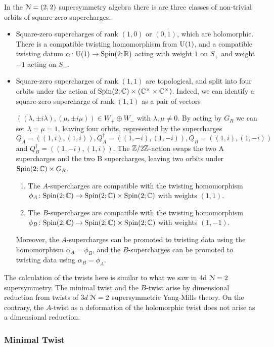 \documentclass[10pt, oneside]{article}
\begin{document}
In the $\mathcal{N}=(2,2)$ supersymmetry algebra there is are three classes of non-trivial orbits of square-zero supercharges.  
\begin{itemize}
 \item Square-zero supercharges of rank $(1,0)$ or $(0,1)$, which are holomorphic.  
There is a compatible twisting homomorphism from $\mathrm{U}(1)$, and a compatible twisting datum $\alpha \colon \mathrm{U}(1) \to \mathrm{Spin}(2;\mathbb R)$ acting with weight $1$ on $S_+$ and weight $-1$ acting on $S_-$.  
 \item Square-zero supercharges of rank $(1,1)$ are topological, and split into four orbits under the action of $\mathrm{Spin}(2;\mathbb C) \times (\mathbb C^\times \times \mathbb C^\times)$.  Indeed, we can identify a square-zero supercharge of rank $(1,1)$ as a pair of vectors~
 
\noindent$((\lambda, \pm i \lambda), (\mu, \pm i \mu)) \in W_+ \oplus W_-$ with $\lambda, \mu \ne 0$.  By acting by $G_R$ we can set $\lambda = \mu = 1$, leaving four orbits, represented by the supercharges $Q_A = ((1,i),(1,i)), Q_A^\dagger = ((1,-i),(1,-i)), Q_B = ((1,i),(1,-i))$ and $Q_B^\dagger = ((1,-i),(1,i))$.  The $\mathbb Z/2\mathbb Z$-action swaps the two A supercharges and the two B supercharges, leaving two orbits under $\mathrm{Spin}(2;\mathbb C) \times G_R$.  
\begin{enumerate}
\item The $A$-supercharges are compatible with the twisting homomorphism $\phi_{A} \colon \mathrm{Spin}(2;\mathbb C) \to \mathrm{Spin}(2;\mathbb C) \times \mathrm{Spin}(2;\mathbb C)$ with weights $(1,1)$.
\item The $B$-supercharges are compatible with the twisting homomorphism $\phi_{B} \colon \mathrm{Spin}(2;\mathbb C) \to \mathrm{Spin}(2;\mathbb C) \times \mathrm{Spin}(2;\mathbb C)$ with weights $(1,-1)$.  
\end{enumerate}
Moreover, the $A$-supercharges can be promoted to twisting data using the homomorphism $\alpha_A = \phi_B$, and the $B$-supercharges can be promoted to twisting data using $\alpha_B = \phi_A$.
\end{itemize}

The calculation of the twists here is similar to what we saw in 4d $\mathcal{N}=2$ supersymmetry.  
The minimal twist and the $B$-twist arise by dimensional reduction from twists of $3d$ $\mathcal N=2$ supersymmetric Yang-Mills theory.
On the contrary, the $A$-twist as a deformation of the holomorphic twist does not arise as a dimensional reduction. 

\subsubsection{Minimal Twist} \label{sect:2d22minimaltwist}
\end{document}
